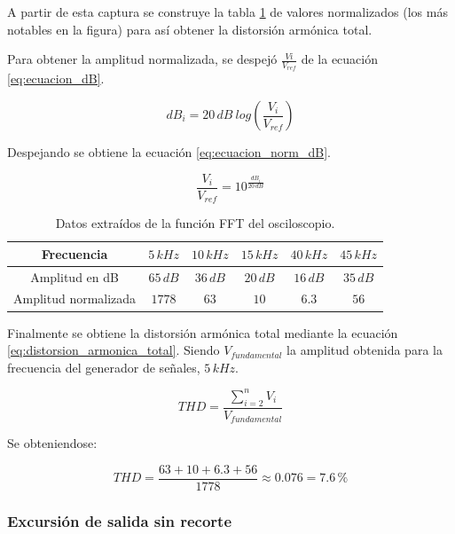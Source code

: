 \documentclass[10pt,spanish,a4paper,notitlepage]{article}
\begin{document}
A partir de esta captura se construye la tabla \ref{table:medicion_FFT} de valores normalizados (los más notables en la figura) para así obtener la distorsión armónica total.

Para obtener la amplitud normalizada, se despejó $\frac{Vi}{V_{ref}}$
de la ecuación \ref{eq:ecuacion_dB}.

\begin{equation}
dB_i = 20\,\unit{dB}\ log\left(\frac{V_i}{V_{ref}}\right)
\label{eq:ecuacion_dB}
\end{equation}

Despejando se obtiene la ecuación \ref{eq:ecuacion_norm_dB}.

\begin{equation}
\frac{V_i}{V_{ref}} = 10^{\frac{dB_i}{20\,\unit{dB}}}
\label{eq:ecuacion_norm_dB}
\end{equation}


\begin{table}[H]
\centering
\begin{tabular}{|c|c|c|c|c|c|} 
\hline
Frecuencia & $5\,\unit{kHz}$ & $10\,\unit{kHz}$ & $15\,\unit{kHz}$ & $40\,\unit{kHz}$ & $45\,\unit{kHz}$ \\ \hline
Amplitud en dB & $65\,\unit{dB}$ & $36\,\unit{dB}$ & $20\,\unit{dB}$ & $16\,\unit{dB}$ & $35\,\unit{dB}$ \\ \hline
Amplitud normalizada & $1778$ & $63$ & $10$ & $6.3$ & $56$ \\ \hline
\end{tabular}
\caption{Datos extraídos de la función FFT del osciloscopio.}
\label{table:medicion_FFT}
\end{table}


Finalmente se obtiene la distorsión armónica total mediante la ecuación
\ref{eq:distorsion_armonica_total}. Siendo $V_{fundamental}$ la amplitud
obtenida para la frecuencia del generador de señales, $5\,\unit{kHz}$.

\begin{equation}
THD = \frac{\sum\limits_{i=2}^{n} V_i}{V_{fundamental}}
\label{eq:distorsion_armonica_total}
\end{equation}

Se obteniendose:

\[ \displaystyle THD = \frac{63+10+6.3+56}{1778} \approx 0.076 = 7.6\,\unit{\%} \]

\subsubsection{Excursión de salida sin recorte}
\end{document}
